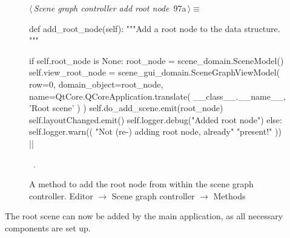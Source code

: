 \documentclass[%
    a4paper,    %
    justified,  %
    nobib,      %
    openany     %
]{tufte-book}
\makeatletter
\renewcommand{\label}[1]{\@tufte@label{##1}}%
\makeatother
\begin{document}
\begin{figure}[!htbp]
\begin{flushleft} \small
\begin{minipage}{\linewidth}\label{scrap27}\raggedright\small
{} $\langle\,${\itshape Scene graph controller add root node}\nobreak\ {\footnotesize {97a}}$\,\rangle\equiv$
\vspace{-1ex}
\begin{pythoncode}
def add_root_node(self):
    """Add a root node to the data structure.
    """

    if self.root_node is None:
        root_node = scene_domain.SceneModel()
        self.view_root_node = scene_gui_domain.SceneGraphViewModel(
            row=0,
            domain_object=root_node,
            name=QtCore.QCoreApplication.translate(
                __class__.__name__, 'Root scene'
            )
        )
        self.do_add_scene.emit(root_node)
        self.layoutChanged.emit()
        self.logger.debug("Added root node")
    else:
        self.logger.warn((
            "Not (re-) adding root node, already"
            "present!"
        ))
|\NWsep|
\end{pythoncode}
\vspace{1.5ex}
\footnotesize
\begin{list}{}{\setlength{\itemsep}{-\parsep}\setlength{\itemindent}{-\leftmargin}}
\item \NWtxtMacroRefIn\ .

\item{}
\end{list}
\end{minipage}\vspace{4ex}
\end{flushleft}
\caption{A method to add the root node from within the scene graph controller.
  \newline{}\newline{}Editor $\rightarrow$ Scene graph controller $\rightarrow$
  Methods}
\end{figure}

The root scene can now be added by the main application, as all necessary
components are set up.
\end{document}
